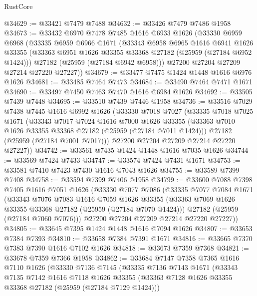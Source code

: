 \begin{lexlean}{RustCore}
\begin{coremodule}
@34629 := @33421 @7479 @7488
@34632 := @33426 @7479 @7486 @1958
@34673 := @33432
    @6970
    @7478
    @7485
    @1616
    @6933
    @1626
    (@33330
      @6959
      @6968
      (@33335
        @6959
        @6966
        @1671
        (@33343
          @6958
          @6965
          @1616
          @6941
          @1626
          @33355
          (@33363 @6951 @1626 @33355 @33368 @27182 (@25959 (@27184 @6952 @1424)))
          @27182
          (@25959 (@27184 @6942 @6958)))
        @27200
        @27204
        @27209
        @27214
        @27220
        @27227))
@34679 := @33477 @7475 @1424 @1448 @1616 @6976 @1626
@34681 := @33485 @7464 @7473
@34684 := @33490 @7464 @7471 @1671
@34690 := @33497 @7450 @7463 @7470 @1616 @6984 @1626
@34692 := @33505 @7439 @7448
@34695 := @33510 @7439 @7446 @1958
@34736 := @33516
    @7029
    @7438
    @7445
    @1616
    @6992
    @1626
    (@33330
      @7018
      @7027
      (@33335
        @7018
        @7025
        @1671
        (@33343
          @7017
          @7024
          @1616
          @7000
          @1626
          @33355
          (@33363 @7010 @1626 @33355 @33368 @27182 (@25959 (@27184 @7011 @1424)))
          @27182
          (@25959 (@27184 @7001 @7017)))
        @27200
        @27204
        @27209
        @27214
        @27220
        @27227))
@34742 := @33561 @7435 @1424 @1448 @1616 @7035 @1626
@34744 := @33569 @7424 @7433
@34747 := @33574 @7424 @7431 @1671
@34753 := @33581 @7410 @7423 @7430 @1616 @7043 @1626
@34755 := @33589 @7399 @7408
@34758 := @33594 @7399 @7406 @1958
@34799 := @33600
    @7088
    @7398
    @7405
    @1616
    @7051
    @1626
    (@33330
      @7077
      @7086
      (@33335
        @7077
        @7084
        @1671
        (@33343
          @7076
          @7083
          @1616
          @7059
          @1626
          @33355
          (@33363 @7069 @1626 @33355 @33368 @27182 (@25959 (@27184 @7070 @1424)))
          @27182
          (@25959 (@27184 @7060 @7076)))
        @27200
        @27204
        @27209
        @27214
        @27220
        @27227))
@34805 := @33645 @7395 @1424 @1448 @1616 @7094 @1626
@34807 := @33653 @7384 @7393
@34810 := @33658 @7384 @7391 @1671
@34816 := @33665 @7370 @7383 @7390 @1616 @7102 @1626
@34818 := @33673 @7359 @7368
@34821 := @33678 @7359 @7366 @1958
@34862 := @33684
    @7147
    @7358
    @7365
    @1616
    @7110
    @1626
    (@33330
      @7136
      @7145
      (@33335
        @7136
        @7143
        @1671
        (@33343
          @7135
          @7142
          @1616
          @7118
          @1626
          @33355
          (@33363 @7128 @1626 @33355 @33368 @27182 (@25959 (@27184 @7129 @1424)))

\end{coremodule}
\end{lexlean}
